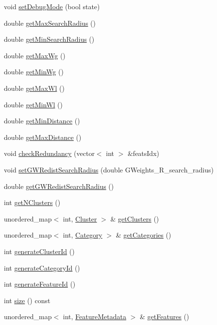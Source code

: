 \begin{DoxyCompactItemize}
\item 
void \hyperlink{class_memory_a6f874ffdeee770c5349c712f0b7d0952}{set\+Debug\+Mode} (bool state)
\item 
double \hyperlink{class_memory_a0317f4f9b25f51ed57b53971439b93de}{get\+Max\+Search\+Radius} ()
\item 
double \hyperlink{class_memory_a22d038e7c6a1a9c273af2f14764cdca5}{get\+Min\+Search\+Radius} ()
\item 
double \hyperlink{class_memory_a094aabdbe0f06bb5a5db61645cead64b}{get\+Max\+Wg} ()
\item 
double \hyperlink{class_memory_aba901fec044454033b0534d2a602eeb4}{get\+Min\+Wg} ()
\item 
double \hyperlink{class_memory_ada2689cdc85e2429579c0e8a75b63b8b}{get\+Max\+Wl} ()
\item 
double \hyperlink{class_memory_a8af1be617551d77f7356e2d10f796af1}{get\+Min\+Wl} ()
\item 
double \hyperlink{class_memory_af8bb8336585ad267f1ea7ca8c35b7421}{get\+Min\+Distance} ()
\item 
double \hyperlink{class_memory_a7cc17e0a04c535832ae23420901b3978}{get\+Max\+Distance} ()
\item 
void \hyperlink{class_memory_a7bd13e3f01051c375764f92c5ad25db6}{check\+Redundancy} (vector$<$ int $>$ \&feats\+Idx)
\item 
void \hyperlink{class_memory_afa0151bc0daa95b0c96aa2f5e750c7c4}{set\+G\+W\+Redist\+Search\+Radius} (double G\+Weights\+\_\+\+R\+\_\+search\+\_\+radius)
\item 
double \hyperlink{class_memory_a46da690515148bd8adaf9fbc7f42e0dc}{get\+G\+W\+Redist\+Search\+Radius} ()
\item 
int \hyperlink{class_memory_aacaf803387738204131008c1a0658fa2}{get\+N\+Clusters} ()
\item 
unordered\+\_\+map$<$ int, \hyperlink{class_cluster}{Cluster} $>$ \& \hyperlink{class_memory_ae40891f66673f8aab1f33efed7fc9750}{get\+Clusters} ()
\item 
unordered\+\_\+map$<$ int, \hyperlink{class_category}{Category} $>$ \& \hyperlink{class_memory_a51f0f9c3a202dd21c9dbae0dbeadaf68}{get\+Categories} ()
\item 
int \hyperlink{class_memory_a02757aec9ff7f8285a28213e9777d56a}{generate\+Cluster\+Id} ()
\item 
int \hyperlink{class_memory_ab31cf2fb776b10af99265c55ef1703d2}{generate\+Category\+Id} ()
\item 
int \hyperlink{class_memory_aa39a1f59ecca722d41b77e34f7c5763c}{generate\+Feature\+Id} ()
\item 
int \hyperlink{class_memory_a91ac81338123d3b57a7f5ee62db8ec8d}{size} () const
\item 
unordered\+\_\+map$<$ int, \hyperlink{class_feature_metadata}{Feature\+Metadata} $>$ \& \hyperlink{class_memory_a0b1d14bfe43af3d3a0353dea8c6eca35}{get\+Features} ()
\end{DoxyCompactItemize}
